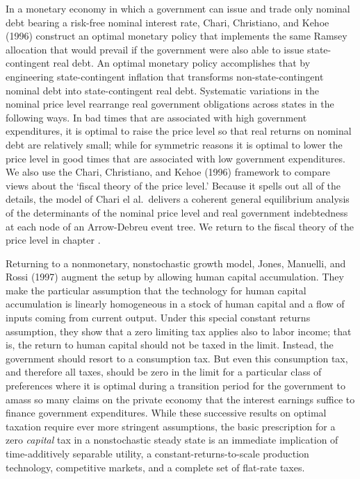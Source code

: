 %
In a monetary economy in which  a government  can issue and trade only
nominal debt bearing a risk-free nominal interest rate,
Chari, Christiano, and Kehoe (1996)
construct an optimal monetary policy that implements the same Ramsey allocation that
would prevail if the government were also  able to  issue state-contingent real debt.
An optimal monetary policy accomplishes that by engineering state-contingent inflation that  transforms
 non-state-contingent nominal  debt into
state-contingent real debt. Systematic variations in the nominal
price level rearrange real government obligations across states in the following ways.
In bad times that are associated with high government expenditures, it is
optimal to raise the price level so that real returns on nominal debt are relatively small; 
while for symmetric reasons it is  optimal to lower the price level in
good times that are  associated with low government expenditures. We also
use the Chari, Christiano, and Kehoe (1996) framework to compare   views about the
`fiscal theory of the price level.' Because it  spells out all of the details, the model of Chari el al.\ delivers a
coherent general equilibrium analysis of the determinants of the
nominal price level and real government indebtedness at each node
of an Arrow-Debreu event tree. We return to the
fiscal theory of the price level in chapter .


  
Returning to a nonmonetary, nonstochastic growth model,
Jones, Manuelli, and Rossi (1997)
augment the setup by allowing human capital accumulation. They
make the  particular assumption that the technology for human
capital accumulation is linearly homogeneous in a stock of human
capital and a flow of  inputs coming from current output. Under
this special constant returns assumption, they show that a zero
limiting tax applies also to labor income; that is, the return to
human capital should not be taxed in the limit. Instead, the
government should resort to a consumption tax. But even this
consumption tax, and therefore all taxes, should be zero in the
limit for a particular class of preferences where it is optimal
during a transition period
for the government to amass so many
claims on the private economy that the interest earnings suffice
to finance government expenditures.
While these successive results on optimal taxation
require ever more stringent assumptions, the
basic prescription for a zero {\it capital\/} tax in a
nonstochastic steady state is an immediate implication of
time-additively separable utility, a
constant-returns-to-scale production technology,
competitive markets, and a complete set of flat-rate taxes.

